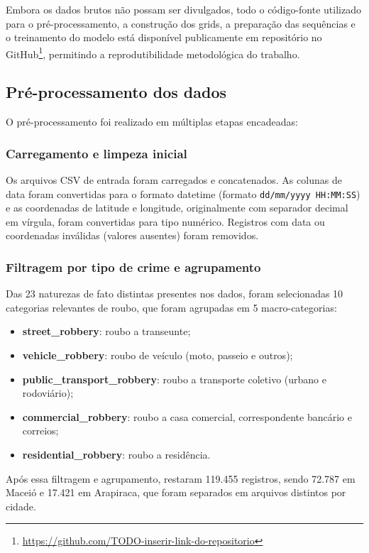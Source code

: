 Embora os dados brutos não possam ser divulgados, todo o código-fonte utilizado para o pré-processamento, a construção dos grids, a preparação das sequências e o treinamento do modelo está disponível publicamente em repositório no GitHub\footnote{\url{https://github.com/TODO-inserir-link-do-repositorio}}, permitindo a reprodutibilidade metodológica do trabalho.

\subsection{Pré-processamento dos dados}
\label{Sec:preprocessamento}

O pré-processamento foi realizado em múltiplas etapas encadeadas:

\subsubsection{Carregamento e limpeza inicial}

Os arquivos CSV de entrada foram carregados e concatenados. As colunas de data foram convertidas para o formato datetime (formato \texttt{dd/mm/yyyy HH:MM:SS}) e as coordenadas de latitude e longitude, originalmente com separador decimal em vírgula, foram convertidas para tipo numérico. Registros com data ou coordenadas inválidas (valores ausentes) foram removidos.

\subsubsection{Filtragem por tipo de crime e agrupamento}

Das 23 naturezas de fato distintas presentes nos dados, foram selecionadas 10 categorias relevantes de roubo, que foram agrupadas em 5 macro-categorias:
\begin{itemize}
  \item \textbf{street\_robbery}: roubo a transeunte;
  \item \textbf{vehicle\_robbery}: roubo de veículo (moto, passeio e outros);
  \item \textbf{public\_transport\_robbery}: roubo a transporte coletivo (urbano e rodoviário);
  \item \textbf{commercial\_robbery}: roubo a casa comercial, correspondente bancário e correios;
  \item \textbf{residential\_robbery}: roubo a residência.
\end{itemize}
Após essa filtragem e agrupamento, restaram 119.455 registros, sendo 72.787 em Maceió e 17.421 em Arapiraca, que foram separados em arquivos distintos por cidade.


